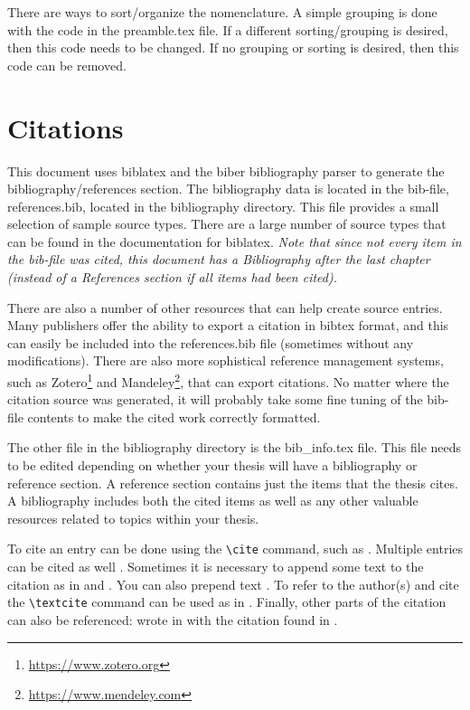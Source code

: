     There are ways to sort/organize the nomenclature.
    A simple grouping is done with the code in the preamble.tex file.
    If a different sorting/grouping is desired, then this code needs to be changed.
    If no grouping or sorting is desired, then this code can be removed.

\section{Citations} \label{sec:Citations}
    This document uses biblatex and the biber bibliography parser to generate the bibliography/references section.
    The bibliography data is located in the bib-file, references.bib, located in the bibliography directory.
    This file provides a small selection of sample source types.
    There are a large number of source types that can be found in the documentation for biblatex.
    \emph{Note that since not every item in the bib-file was cited, this document has a Bibliography after the last chapter (instead of a References section if all items had been cited).}

    There are also a number of other resources that can help create source entries.
    Many publishers offer the ability to export a citation in bibtex format, and this can easily be included into the references.bib file (sometimes without any modifications).
    There are also more sophistical reference management systems, such as Zotero\footnote{ \url{https://www.zotero.org}} and Mandeley\footnote{\url{https://www.mendeley.com}}, that can export citations.
    No matter where the citation source was generated, it will probably take some fine tuning of the bib-file contents to make the cited work correctly formatted.

    The other file in the bibliography directory is the bib\_info.tex file.
    This file needs to be edited depending on whether your thesis will have a bibliography or reference section.
    A reference section contains just the items that the thesis cites.
    A bibliography includes both the cited items as well as any other valuable resources related to topics within your thesis.

    To cite an entry can be done using the \lstinline|\cite| command, such as \cite{cpthesis_github}.
    Multiple entries can be cited as well \cite{drela1986a,dryden1943a,einstein1905,lopez2007a}.
    Sometimes it is necessary to append some text to the citation as in \cite[135]{dryden1943a} and \cite[section 2]{head1958a}.
    You can also prepend text \cite[such as][120]{Koutsovasilis2008}.
    To refer to the author(s) and cite the \lstinline|\textcite| command can be used as in     \textcite{dirac1981}.
    Finally, other parts of the citation can also be referenced: \citeauthor{einstein1905} wrote  in \citeyear{einstein1905} with the citation found in \cite{einstein1905}.

